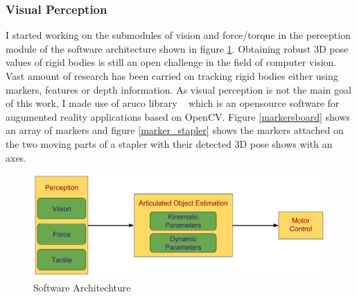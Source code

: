 \documentclass[12pt,a4paper]{report}
\begin{document}
\subsubsection*{Visual Perception}
I started working on the submodules of vision and force/torque in the perception module of the software architecture shown in figure \ref{SoftArc}. Obtaining robust 3D pose values of rigid bodies is still an open challenge in the field of computer vision. Vast amount of research has been carried on tracking rigid bodies either using markers, features or depth information. As visual perception is not the main goal of this work, I made use of aruco library ~\cite{Aruco2014} which is an opensource software for augumented reality applications based on OpenCV. Figure \ref{markersboard} shows an array of markers and figure \ref{marker_stapler} shows the markers attached on the two moving parts of a stapler with their detected 3D pose shows with an axes.

\begin{figure}[H]
	\centering
	\includegraphics[scale=0.3]{figures/SoftwareArch_year1.png}
	\caption{Software Architechture}		
	\label{SoftArc}
\end{figure}
\end{document}
